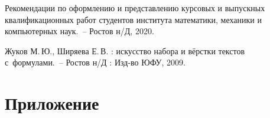 \documentclass[14pt]{mmcs_article}
\begin{document}
\newpage

\renewcommand{\refname}{\centering \textbf{Литература}}

\begin{thebibliography}{0}
  Рекомендации по оформлению
  и представлению курсовых
  и выпускных квалификационных работ
  студентов института математики,
  механики и компьютерных наук.~--
  Ростов н/Д, 2020.

  Жуков М.\,Ю., Ширяева Е.\,В.
  \LaTeXe: искусство набора и вёрстки текстов с~формулами.~-- Ростов н/Д : Изд-во ЮФУ, 2009.
\end{thebibliography}


\newpage
\section*{Приложение}
\end{document}
